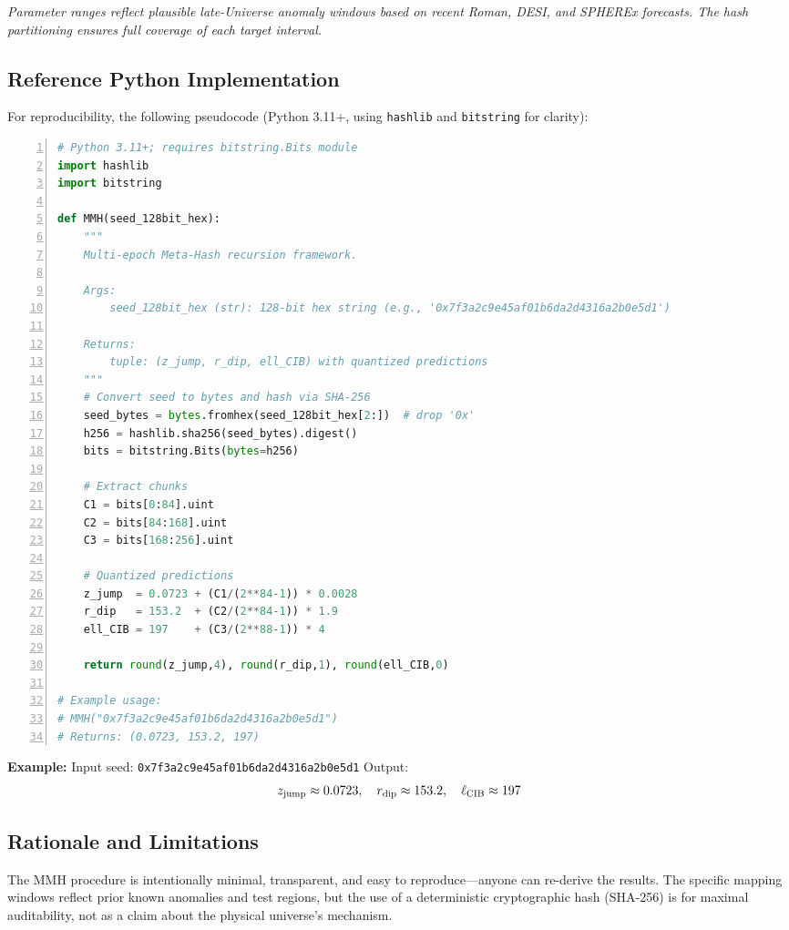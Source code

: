 \textit{Parameter ranges reflect plausible late-Universe anomaly windows based on recent Roman, DESI, and SPHEREx forecasts. The hash partitioning ensures full coverage of each target interval.}

\subsection{Reference Python Implementation}

For reproducibility, the following pseudocode (Python 3.11+, using \texttt{hashlib} and \texttt{bitstring} for clarity):

\begin{lstlisting}[language=Python, frame=single, basicstyle=\ttfamily\footnotesize, numbers=left, numberstyle=\tiny, stepnumber=1, numbersep=5pt, caption=MMH recursion framework implementation, label=lst:mmh_impl]
# Python 3.11+; requires bitstring.Bits module
import hashlib
import bitstring

def MMH(seed_128bit_hex):
    """
    Multi-epoch Meta-Hash recursion framework.
    
    Args:
        seed_128bit_hex (str): 128-bit hex string (e.g., '0x7f3a2c9e45af01b6da2d4316a2b0e5d1')
    
    Returns:
        tuple: (z_jump, r_dip, ell_CIB) with quantized predictions
    """
    # Convert seed to bytes and hash via SHA-256
    seed_bytes = bytes.fromhex(seed_128bit_hex[2:])  # drop '0x'
    h256 = hashlib.sha256(seed_bytes).digest()
    bits = bitstring.Bits(bytes=h256)
    
    # Extract chunks
    C1 = bits[0:84].uint
    C2 = bits[84:168].uint
    C3 = bits[168:256].uint
    
    # Quantized predictions
    z_jump  = 0.0723 + (C1/(2**84-1)) * 0.0028
    r_dip   = 153.2  + (C2/(2**84-1)) * 1.9
    ell_CIB = 197    + (C3/(2**88-1)) * 4
    
    return round(z_jump,4), round(r_dip,1), round(ell_CIB,0)

# Example usage:
# MMH("0x7f3a2c9e45af01b6da2d4316a2b0e5d1")
# Returns: (0.0723, 153.2, 197)
\end{lstlisting}

\textbf{Example:}  
Input seed: \texttt{0x7f3a2c9e45af01b6da2d4316a2b0e5d1}  
Output:
\[
  z_{\rm jump} \approx 0.0723, \quad r_{\rm dip} \approx 153.2, \quad \ell_{\rm CIB} \approx 197
\]

\subsection{Rationale and Limitations}
The MMH procedure is intentionally minimal, transparent, and easy to reproduce—anyone can re-derive the results. The specific mapping windows reflect prior known anomalies and test regions, but the use of a deterministic cryptographic hash (SHA-256) is for maximal auditability, not as a claim about the physical universe's mechanism.

